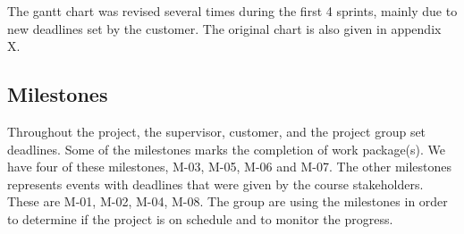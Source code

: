 The gantt chart was revised several times during the first 4 sprints,
mainly due to new deadlines set by the customer. The original chart is
also given in appendix X.

\subsection{Milestones}
Throughout the project, the supervisor, customer, and the project group
set deadlines.
Some of the milestones marks the completion of work package(s). We have
four of these milestones, M-03, M-05, M-06 and M-07. The other
milestones represents events with deadlines that were given by the
course stakeholders. These are M-01, M-02, M-04, M-08. The group are
using the milestones in order to determine if the project is on
schedule and to monitor the progress.

